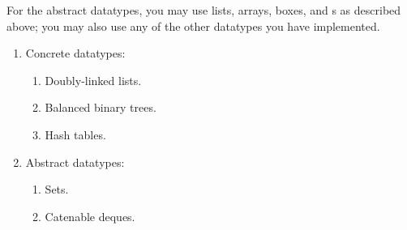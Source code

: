 \documentclass{article}
\begin{document}
For the abstract datatypes, you may use lists, arrays, boxes, and s
as described above; you may also use any of the other datatypes you have
implemented.

\begin{enumerate}

\item Concrete datatypes:
  \begin{enumerate}
  \item Doubly-linked lists.
  \item Balanced binary trees.
  \item Hash tables.
  \end{enumerate}

\item Abstract datatypes:
  \begin{enumerate}
  \item Sets.
  \item Catenable deques.
  \end{enumerate}

\end{enumerate}
\end{document}

